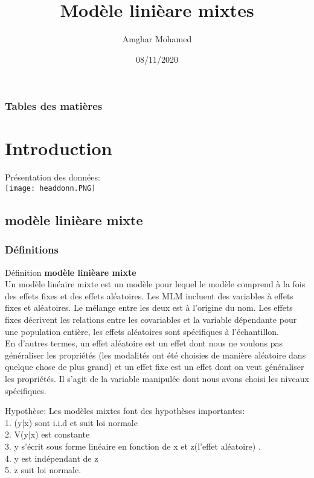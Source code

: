 \documentclass[11pt]{beamer}
\author{Amghar  Mohamed}
\title{Modèle linièare mixtes }
\institute{Enseignant : Mr Salmon Joseph}
\date{08/11/2020}
\begin{document}
\begin{frame}
\titlepage
\end{frame}

\begin{frame}
\frametitle{Tables des matières}
\tableofcontents[setionstyle=show,subsubsectionstyle=show, subsectionstyle=show]
\end{frame}

\section{Introduction}
\begin{center}
Présentation des données:\\
    \texttt{[image: headdonn.PNG]}
\end{center}
\subsection{modèle linièare mixte} 
\subsubsection{ Définitions }
\begin{frame}
\begin{block}{Définition}
\textbf{modèle linièare mixte}\\
 Un modèle linéaire mixte est un modèle pour lequel le modèle comprend à la fois des effets fixes et des
effets aléatoires. Les MLM incluent des variables à effets fixes et aléatoires. Le mélange entre les deux est à
l'origine du nom. Les effets fixes décrivent les relations entre les covariables et la variable dépendante pour
une population entière, les effets aléatoires sont spécifiques à l'échantillon.\\
En d'autres termes, un effet aléatoire est un effet dont nous ne voulons pas généraliser les propriétés (les
modalités ont été choisies de manière aléatoire dans quelque chose de plus grand) et un effet fixe est un
effet dont on veut généraliser les propriétés. Il s'agit de la variable manipulée dont nous avons choisi les
niveaux spécifiques.
\end{block}
\end{frame}

\begin{frame}
\begin{block}{Hypothèse: }
Les modèles mixtes font des hypothèses importantes:\\
1. (y|x) sont i.i.d et suit loi normale\\
2. V(y|x) est constante\\
3. y s'écrit sous forme linéaire en fonction de x et z(l'effet aléatoire) .\\
4. y est indépendant de z\\
5. z suit loi normale.\\
\end{block}
\end{frame}
\end{document}
